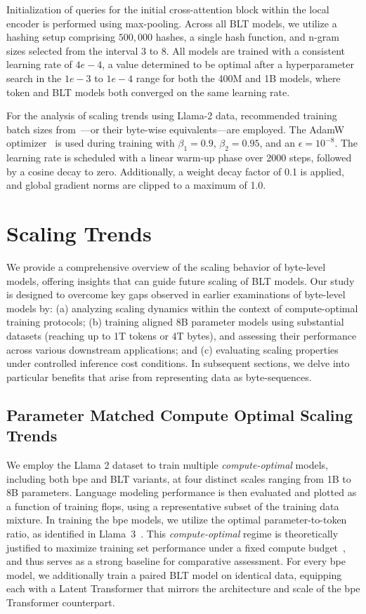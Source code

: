 Initialization of queries for the initial cross-attention block within the local encoder is performed using max-pooling. Across all {\textsc BLT} models, we utilize a hashing setup comprising $500,000$ hashes, a single hash function, and n-gram sizes selected from the interval 3 to 8. All models are trained with a consistent learning rate of $4e-4$, a value determined to be optimal after a hyperparameter search in the $1e-3$ to $1e-4$ range for both the 400M and 1B models, where token and {\textsc BLT} models both converged on the same learning rate.

For the analysis of scaling trends using Llama-2 data, recommended training batch sizes from~\cite{dubey2024llama}—or their byte-wise equivalents—are employed. The AdamW optimizer~\citep{adamw} is used during training with $\beta_1 = 0.9$, $\beta_2 = 0.95$, and an $\epsilon = 10^{-8}$. The learning rate is scheduled with a linear warm-up phase over 2000 steps, followed by a cosine decay to zero. Additionally, a weight decay factor of 0.1 is applied, and global gradient norms are clipped to a maximum of 1.0.

\section{Scaling Trends}
\label{section:scaling}

We provide a comprehensive overview of the scaling behavior of byte-level models, offering insights that can guide future scaling of {\textsc BLT} models. Our study is designed to overcome key gaps observed in earlier examinations of byte-level models by: (a) analyzing scaling dynamics within the context of compute-optimal training protocols; (b) training aligned 8B parameter models using substantial datasets (reaching up to 1T tokens or 4T bytes), and assessing their performance across various downstream applications; and (c) evaluating scaling properties under controlled inference cost conditions. In subsequent sections, we delve into particular benefits that arise from representing data as byte-sequences.

\subsection{Parameter Matched Compute Optimal Scaling Trends}
\label{section:parameter-matched-scaling}
We employ the Llama 2 dataset to train multiple \textit{compute-optimal} models, including both bpe and {\textsc BLT} variants, at four distinct scales ranging from 1B to 8B parameters. Language modeling performance is then evaluated and plotted as a function of training flops, using a representative subset of the training data mixture. In training the bpe models, we utilize the optimal parameter-to-token ratio, as identified in Llama~3~\citep{dubey2024llama}. This \textit{compute-optimal} regime is theoretically justified to maximize training set performance under a fixed compute budget~\citep{hoffmann2022training}, and thus serves as a strong baseline for comparative assessment. For every bpe model, we additionally train a paired {\textsc BLT} model on identical data, equipping each with a Latent Transformer that mirrors the architecture and scale of the bpe Transformer counterpart.

